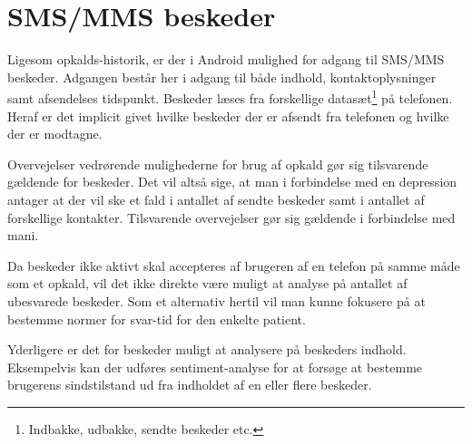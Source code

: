 \section{SMS/MMS beskeder}\label{datasamling:smsmms}
Ligesom opkalds-historik, er der i Android mulighed for adgang til SMS/MMS beskeder.
Adgangen består her i adgang til både indhold, kontaktoplysninger samt afsendelses tidspunkt.
Beskeder læses fra forskellige datasæt\footnote{Indbakke, udbakke, sendte beskeder etc.} på telefonen.
Heraf er det implicit givet hvilke beskeder der er afsendt fra telefonen og hvilke der er modtagne.

Overvejelser vedrørende mulighederne for brug af opkald gør sig tilsvarende gældende for beskeder.
Det vil altså sige, at man i forbindelse med en depression antager at der vil ske et fald i antallet af sendte beskeder samt i antallet af forskellige kontakter.
Tilsvarende overvejelser gør sig gældende i forbindelse med mani.

Da beskeder ikke aktivt skal accepteres af brugeren af en telefon på samme måde som et opkald, vil det ikke direkte være muligt at analyse på antallet af ubesvarede beskeder.
Som et alternativ hertil vil man kunne fokusere på at bestemme normer for svar-tid for den enkelte patient.

Yderligere er det for beskeder muligt at analysere på beskeders indhold.
Eksempelvis kan der udføres sentiment-analyse for at forsøge at bestemme brugerens sindstilstand ud fra indholdet af en eller flere beskeder.
